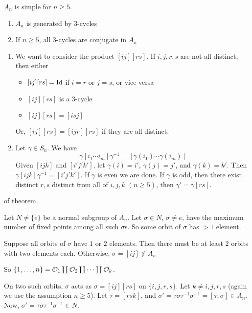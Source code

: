\documentclass[x11names,reqno,14pt]{extarticle}
\begin{document}
\thm $A_n$ is simple for $n \geq 5$. 

\lem

\begin{enumerate}[label=(\alph*)]
\item $A_n$ is generated by $3$-cycles
\item If $n \geq 5$, all $3$-cycles are conjugate in $A_n$ 
\end{enumerate}

\proof

\begin{enumerate}[label=(\alph*)]
\item We want to consider the product $[ij][rs]$. If $i, j, r, s$ are not all distinct, then either 

\begin{itemize}
\item $[ij][rs] = \operatorname{\mathrm{Id}}$ if $i = r$ or $j = s$, or vice versa
\item $[ij][rs]$ is a $3$-cycle
\item $[ij][rs] = [isj]$
\end{itemize}

Or, $[ij][rs] = [ijr][rs]$ if they are all distinct. 


\item Let $\gamma \in S_n$. We have
\[
\gamma[i_1\cdots i_m]\gamma^{-1} = [\gamma(i_1)\cdots\gamma(i_m)]
\]
Given $[ijk]$ and $[i'j'k']$, let $\gamma(i) = i'$, $\gamma(j) = j'$, and $\gamma(k) = k'$. Then $\gamma[ijk]\gamma^{-1} = [i'j'k']$. If $\gamma$ is even we are done. If $\gamma$ is odd, then there exist distinct $r, s$ distinct from all of $i, j, k$ $(n \geq 5)$, then $\gamma' = \gamma[rs]$.
\end{enumerate}

\proof of theorem. 

Let $N \neq \{e\}$ be a normal subgroup of $A_n$. Let $\sigma \in N$, $\sigma\neq e$, have the maximum number of fixed points among all such $\sigma$s. So some orbit of $\sigma$ has $> 1$ element.

Suppose all orbits of $\sigma$ have $1$ or $2$ elements. Then there must be at least $2$ orbits with two elements each. Otherwise, $\sigma = [ij]\not\in A_n$

So $\{1, \dots, n\} = \mathcal{O}_1\coprod \mathcal{O}_2 \coprod \cdots \coprod \mathcal{O}_k$.  

On two such orbits, $\sigma$ acts as $\sigma = [ij][rs]$ on $\{i,j,r,s\}$. Let $k \neq i,j,r,s$ (again we use the assumption $n \geq 5$). Let $\tau = [rsk]$, and $\sigma' = \tau\sigma\tau^{-1}\sigma^{-1} = [\tau,\sigma] \in A_n$. Now, $\sigma ' = \tau\sigma\tau^{-1}\sigma^{-1}\in N$.
\end{document}
